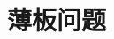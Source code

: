 \documentclass[engineeringmaster]{hquThesis}
\begin{document}


\mainmatter
\chapter{薄板问题}
\end{document}
